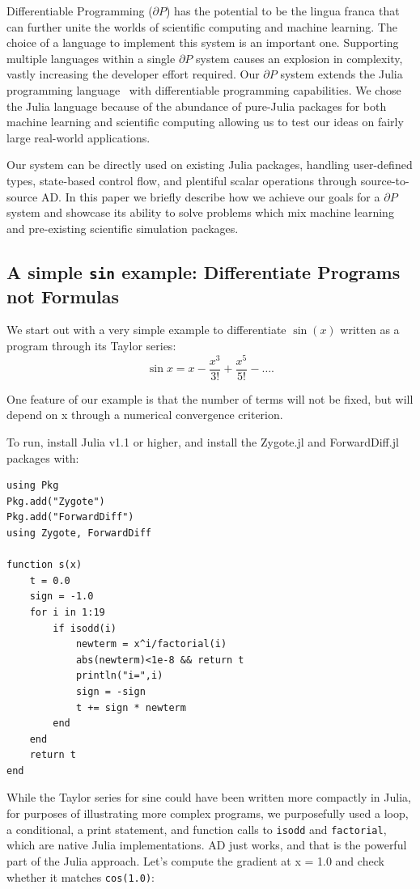 \documentclass{juliacon}
\begin{document}
    Differentiable Programming ($\partial P$) has the potential to be the lingua franca that can further unite the worlds of scientific computing and machine learning. The choice of a language to implement this system is an important one. Supporting multiple languages within a single $\partial P$ system causes an explosion in complexity, vastly increasing the developer effort required. Our $\partial P$ system extends the Julia programming language~\cite{Julia-2017-a} with differentiable programming capabilities. We chose the Julia language because of the abundance of pure-Julia packages for both machine learning and scientific computing allowing us to test our ideas on fairly large real-world applications.
    
    Our system can be directly used on existing Julia packages, handling  user-defined types, state-based control flow, and plentiful scalar operations through source-to-source AD. In this paper we briefly describe how we achieve our goals for a $\partial P$ system and showcase its ability to solve problems which mix machine learning and pre-existing scientific simulation packages. 
    
\subsection{A simple {\tt sin} example: Differentiate Programs not Formulas}

We start out with a very simple example to differentiate $\sin(x)$ written as a program through its Taylor series:
$$\sin x =
x - \frac{x^3}{3!}
+\frac{x^5}{5!}-\ldots .$$


One feature of our example is that the number of terms will not be fixed, but will depend on x through a numerical convergence criterion.

To run, install Julia v1.1 or higher, and install the Zygote.jl and ForwardDiff.jl packages with:

\begin{verbatim}
using Pkg
Pkg.add("Zygote")
Pkg.add("ForwardDiff")
using Zygote, ForwardDiff

function s(x) 
    t = 0.0
    sign = -1.0 
    for i in 1:19   
        if isodd(i)
            newterm = x^i/factorial(i)
            abs(newterm)<1e-8 && return t
            println("i=",i)
            sign = -sign
            t += sign * newterm
        end
    end
    return t 
end
\end{verbatim}

While the Taylor series for sine could have been written more compactly in Julia, for purposes of illustrating more complex programs, we purposefully used a loop, a conditional, a print statement, and function calls to \verb+isodd+ and \verb+factorial+, which are native Julia implementations. AD just works, and that is the powerful part of the Julia approach. Let’s compute the gradient at x = 1.0 and check whether it matches \verb+cos(1.0)+:
\end{document}
